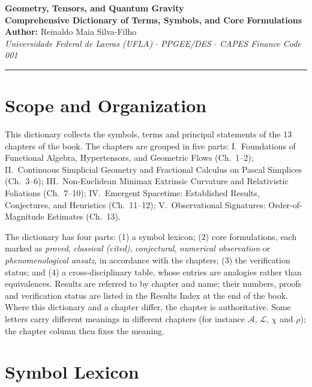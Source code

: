 \documentclass[11pt,a4paper,oneside]{article}
\begin{document}
\begin{center}
    {\LARGE \textbf{Geometry, Tensors, and Quantum Gravity}}\\[0.3cm]
    {\Large \textbf{Comprehensive Dictionary of Terms, Symbols, and Core Formulations}}\\[0.4cm]
    {\normalsize \textbf{Author:} Reinaldo Maia Silva-Filho}\\[0.2cm]
    {\footnotesize \textit{Universidade Federal de Lavras (UFLA) $\cdot$ PPGEE/DES $\cdot$ CAPES Finance Code 001}}
\end{center}

\vspace{0.4cm}
\hrule
\vspace{0.4cm}

\section*{Scope and Organization}
This dictionary collects the symbols, terms and principal statements of the 13 chapters of the book. The chapters are grouped in five parts: I.~Foundations of Functional Algebra, Hypertensors, and Geometric Flows (Ch.~1--2); II.~Continuous Simplicial Geometry and Fractional Calculus on Pascal Simplices (Ch.~3--6); III.~Non-Euclidean Minimax Extrinsic Curvature and Relativistic Foliations (Ch.~7--10); IV.~Emergent Spacetime: Established Results, Conjectures, and Heuristics (Ch.~11--12); V.~Observational Signatures: Order-of-Magnitude Estimates (Ch.~13).

The dictionary has four parts: (1) a symbol lexicon; (2) core formulations, each marked as \emph{proved}, \emph{classical (cited)}, \emph{conjectural}, \emph{numerical observation} or \emph{phenomenological ansatz}, in accordance with the chapters; (3) the verification status; and (4) a cross-disciplinary table, whose entries are analogies rather than equivalences. Results are referred to by chapter and name; their numbers, proofs and verification status are listed in the Results Index at the end of the book. Where this dictionary and a chapter differ, the chapter is authoritative. Some letters carry different meanings in different chapters (for instance $\mathcal{A}$, $\mathcal{L}$, $\chi$ and $\rho$); the chapter column then fixes the meaning.

\section{Symbol Lexicon}
\end{document}
